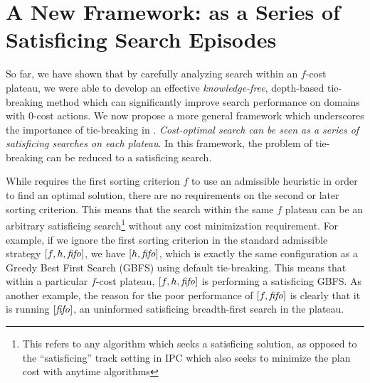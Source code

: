 \clearpage 
\section{A New Framework:  \astar as a Series of Satisficing Search Episodes}
\label{sec:discussion}

So far, we have shown that by carefully analyzing search within an $f$-cost plateau,
we were able to develop an effective
{\it knowledge-free}, depth-based tie-breaking method which can significantly improve search performance on domains with 0-cost actions.
We now propose a more general framework which underscores the importance of tie-breaking in \astar.
\emph{Cost-optimal search
can be seen as a series of satisficing searches on each plateau}. In this framework, the problem of tie-breaking can be
reduced to a satisficing search.


While \astar requires the first sorting criterion $f$ to use an admissible heuristic in order to find an optimal solution,
there are no requirements on the second or later sorting criterion.
This means that the search within the same $f$ plateau can be an arbitrary  satisficing search\footnote{This refers to any algorithm which seeks a satisficing solution, as opposed to the ``satisficing'' track setting in IPC which also seeks to minimize the plan cost with anytime algorithms} without any cost minimization requirement. For example,
if we ignore the first sorting criterion in the standard admissible strategy
$[f,h,{\text{\textit{fifo}}}]$, we have $[h,{\text{\textit{fifo}}}]$, which is exactly
the same configuration as a Greedy Best First Search (GBFS) using \fifo default tie-breaking. This 
means that within a particular $f$-cost plateau, $[f,h,{\text{\textit{fifo}}}]$ is
performing a satisficing GBFS.
As another example, the reason for the poor performance of $[f,{\text{\textit{fifo}}}]$
is clearly that it is running $[{\text{\textit{fifo}}}]$,
an uninformed satisficing breadth-first search in the plateau.

